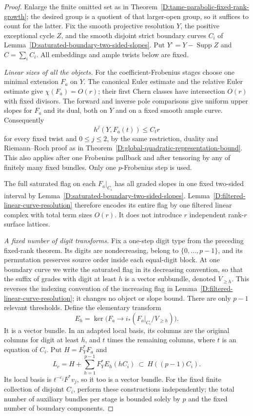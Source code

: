 \begin{proof}
Enlarge the finite omitted set as in
Theorem~\ref{D:tame-parabolic-fixed-rank-growth};
the desired group is a quotient of that larger-open
group, so it suffices to count for the latter.
Fix the smooth projective resolution $Y$, the positive
exceptional cycle $Z$, and the smooth disjoint strict
boundary curves $C_i$ of
Lemma~\ref{D:saturated-boundary-two-sided-slopes}.
Put $Y^\circ=Y-\operatorname{Supp}Z$ and
$C=\sum_iC_i$.  All embeddings and ample twists
below are fixed.

\emph{Linear sizes of all the objects.}
For the coefficient-Frobenius stages choose one
minimal extension $F_a$ on $Y$.  The canonical
Euler estimate and the relative Euler estimate
give $\chi(F_a)=O(r)$; their first Chern classes
have intersection $O(r)$ with fixed divisors.
The forward and inverse pole comparisons give
uniform upper slopes for $F_a$ and its dual,
both on $Y$ and on a fixed smooth ample curve.
Consequently
\[
                    h^j(Y,F_a(t))\le C_t r
\]
for every fixed twist and $0\le j\le2$, by the
same restriction, duality and Riemann--Roch proof
as in Theorem~\ref{D:global-quadratic-representation-bound}.
This also applies after one Frobenius pullback
and after tensoring by any of finitely many fixed
bundles.  Only one $p$-Frobenius step is used.

The full saturated flag on each $F_a|_{C_i}$ has
all graded slopes in one fixed two-sided interval
by Lemma~\ref{D:saturated-boundary-two-sided-slopes}.
Lemma~\ref{D:filtered-linear-curve-resolution}
therefore encodes its entire flag by one filtered
linear complex with total term sizes $O(r)$.
It does not introduce $r$ independent rank-$r$
surface lattices.

\emph{A fixed number of digit transforms.}
Fix a one-step digit type from the preceding
fixed-rank theorem.  Its digits are nondecreasing,
belong to $\{0,\ldots,p-1\}$, and its permutation
preserves source order inside each equal-digit block.
At one boundary curve we write the saturated flag in its
decreasing convention, so that the suffix of grades with
digit at least $h$ is a vector subbundle, denoted $V_{\ge h}$.
This reverses the indexing convention of the increasing flag
in Lemma~\ref{D:filtered-linear-curve-resolution}; it changes
no object or slope bound.  There are only $p-1$ relevant thresholds.
Define the elementary transform
\[
 E_h=\ker\bigl(F_a\longrightarrow
             i_*(F_a|_{C_i}/V_{\ge h})\bigr).
                                                        \tag{D.TQ.2}
\]
It is a vector bundle.  In an adapted local basis,
its columns are the original columns for digit
at least $h$, and $t$ times the remaining columns,
where $t$ is an equation of $C_i$.
Put $H=F_Y^*F_a$ and
\[
 L_c=H+\sum_{h=1}^{p-1}F_Y^*E_h(hC_i)
                      \ \subset\ H((p-1)C_i).           \tag{D.TQ.3}
\]
Its local basis is $t^{-c_j}F^*v_j$, so it too is
a vector bundle.  For the fixed finite collection
of disjoint $C_i$, perform these constructions
independently; the total number of auxiliary
bundles per stage is bounded solely by $p$ and
the fixed number of boundary components.


\end{proof}
